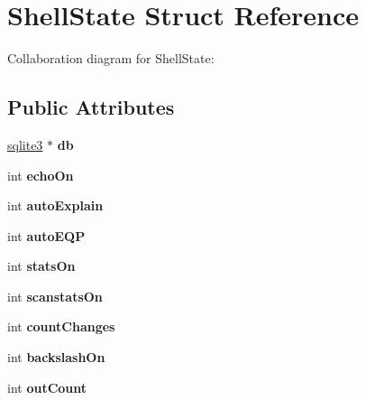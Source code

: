 \hypertarget{structShellState}{}\section{Shell\+State Struct Reference}
\label{structShellState}


Collaboration diagram for Shell\+State\+:
\subsection*{Public Attributes}
\begin{DoxyCompactItemize}
\item 
\hyperlink{structsqlite3}{sqlite3} $\ast$ {\bfseries db}\hypertarget{structShellState_aff5184c68cc62f6db1876cc28ffaf7e0}{}\label{structShellState_aff5184c68cc62f6db1876cc28ffaf7e0}

\item 
int {\bfseries echo\+On}\hypertarget{structShellState_a1df59448f712867b5acc5427fb929534}{}\label{structShellState_a1df59448f712867b5acc5427fb929534}

\item 
int {\bfseries auto\+Explain}\hypertarget{structShellState_a1ce80144b7c10d594fcd1cbba9b4a874}{}\label{structShellState_a1ce80144b7c10d594fcd1cbba9b4a874}

\item 
int {\bfseries auto\+E\+QP}\hypertarget{structShellState_ab3a2de04a6ec0c08da36f5b2a8870df0}{}\label{structShellState_ab3a2de04a6ec0c08da36f5b2a8870df0}

\item 
int {\bfseries stats\+On}\hypertarget{structShellState_a07631569595d0bac838efef39e6e147d}{}\label{structShellState_a07631569595d0bac838efef39e6e147d}

\item 
int {\bfseries scanstats\+On}\hypertarget{structShellState_aac5055c5404f54e65f52dfdab67cc49d}{}\label{structShellState_aac5055c5404f54e65f52dfdab67cc49d}

\item 
int {\bfseries count\+Changes}\hypertarget{structShellState_a776d2743523117e09ddbf564b3ca6731}{}\label{structShellState_a776d2743523117e09ddbf564b3ca6731}

\item 
int {\bfseries backslash\+On}\hypertarget{structShellState_afdc489576eedbfa48db76d5f3ffc9ab4}{}\label{structShellState_afdc489576eedbfa48db76d5f3ffc9ab4}

\item 
int {\bfseries out\+Count}\hypertarget{structShellState_aa3830a7924f73f6ff4eb27fd11ef4a14}{}\label{structShellState_aa3830a7924f73f6ff4eb27fd11ef4a14}


\end{DoxyCompactItemize}
